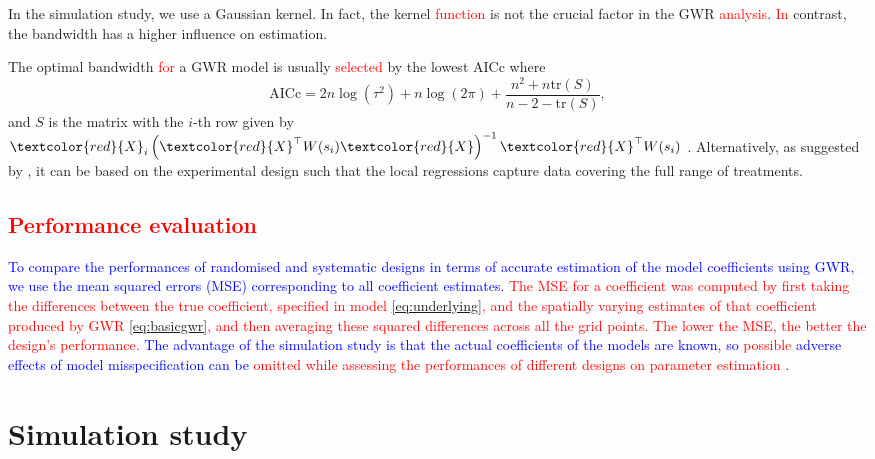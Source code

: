 \documentclass[a4paper]{article} 	%
\newcommand{\tr}{\mathrm{tr}}
\newcommand{\R}{\texttt{R}}
\newcommand{\revision}[1]{\textcolor{red}{#1}}
\newcommand{\zc}[1]{\textcolor{blue}{#1}}
\begin{document}
In the simulation study, we use a Gaussian kernel. In fact, the kernel \revision{function} is not the crucial factor in the GWR \revision{analysis}. \revision{In} contrast, the bandwidth has a higher influence on estimation. 


The optimal bandwidth \revision{for} a GWR model is usually \revision{selected} by the lowest AICc where 
\begin{equation}\label{eq:aicc}
	\mbox{AICc} = 2n\log (\tau^2) + n \log (2\pi) + \frac{n^2+n\tr (S)}{n-2-\tr (S)},
\end{equation}
and $S$ is the matrix with the $i$-th row given by $\revision{X}_i\left( \revision{X}^\top W(s_i) \revision{X} \right)^{-1}\revision{X}^\top W(s_i)$ \parencite{Evans2020Assessment}. Alternatively, as suggested by \textcite{Rakshit2020Novel}, it can be based on the experimental design such that the local regressions capture data covering the full range of treatments.



\subsection{\revision{Performance evaluation}}


\zc{To compare the performances of randomised and systematic designs in terms of accurate estimation of the model coefficients using GWR, we use the mean squared errors (MSE) corresponding to all coefficient estimates.} \revision{The MSE for a coefficient was computed by first taking the differences between the true coefficient, specified in model \eqref{eq:underlying}, and the spatially varying estimates of that coefficient produced by GWR \eqref{eq:basicgwr}, and then averaging these squared differences across all the grid points. The lower the MSE, the better the design's performance.} \zc{The advantage of the simulation study is that the actual coefficients of the models are known, so} \revision{possible} \zc{adverse effects of model misspecification can be} \revision{omitted while assessing the performances of different designs on parameter estimation} \parencite{Piepho2013Why}. 


\section{Simulation study}\label{Sec:Simu}
\end{document}
